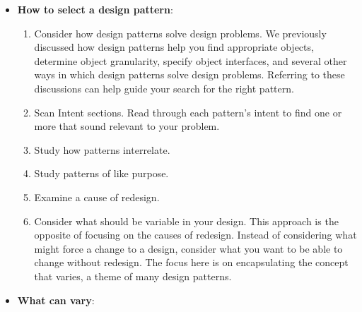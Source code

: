 \documentclass{report}
\begin{document}
\begin{itemize}
\begin{enumerate}
                \item Design patterns are smaller architectural elements than frameworks. A typical framework contains several design patterns, but the reverse is never true.
                \item Design patterns are less specialized than frameworks. Frameworks always have a particular application domain. A graphical editor framework might be used in a factory simulation, but it won't be mistaken for a simulation framework. In contrast, the design patterns in this catalog can be used in nearly any kind of application. While more specialized design patterns than ours are certainly possible (say, design patterns for distributed systems or concurrent programming), even these wouldn't dictate an application architecture like a framework would.
            \end{enumerate}
        \item \textbf{How to select a design pattern}: 
            \begin{enumerate}
                \item Consider how design patterns solve design problems. We previously discussed how design patterns help you find appropriate objects, determine object granularity, specify object interfaces, and several other ways in which design patterns solve design problems. Referring to these discussions can help guide your search for the right pattern.
                \item Scan Intent sections. Read through each pattern's intent to find one or more that sound relevant to your problem. 
                \item Study how patterns interrelate. 
                \item Study patterns of like purpose. 
                \item Examine a cause of redesign. 
                \item Consider what should be variable in your design. This approach is the opposite of focusing on the causes of redesign. Instead of considering what might force a change to a design, consider what you want to be able to change without redesign. The focus here is on encapsulating the concept that varies, a theme of many design patterns. 
            \end{enumerate}
        \item \textbf{What can vary}:
            \bigbreak \noindent 
            \begin{center}
                \begin{tabularx}{\textwidth}{@{}llX@{}}

\end{tabularx}
\end{center}
\end{itemize}
\end{document}
